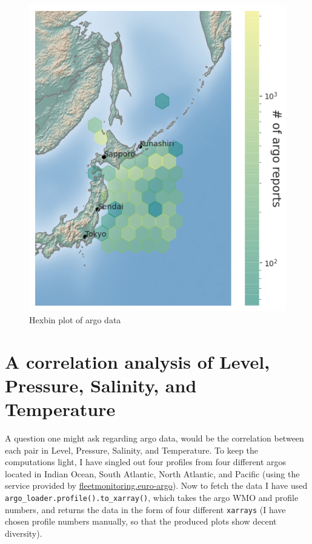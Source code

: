 \documentclass[12pt]{article}
\begin{document}
\begin{figure}[H]
\centering
\includegraphics[scale=0.9]{hexbin_argos_locations.png}
\caption{Hexbin plot of argo data}
\label{hexbin}
\end{figure}

\section{A correlation analysis of Level, Pressure, Salinity, 
and Temperature}

A question one might ask regarding argo data, would be the correlation 
between each pair in Level, 
Pressure, Salinity, and Temperature. To keep the computations light, 
I have singled out four profiles from four different
argos located in Indian Ocean, South Atlantic, North Atlantic, and 
Pacific (using the service provided by 
\href{https://fleetmonitoring.euro-argo.eu/dashboard?Status=Active}{fleetmonitoring.euro-argo}). Now to fetch  
the data I have used \verb|argo_loader.profile().to_xarray()|, which 
takes the argo WMO and profile numbers, and returns the data
in the form of four different \verb|xarrays| (I have chosen profile 
numbers 
manually, so that the produced plots show decent diversity).\\
\end{document}
